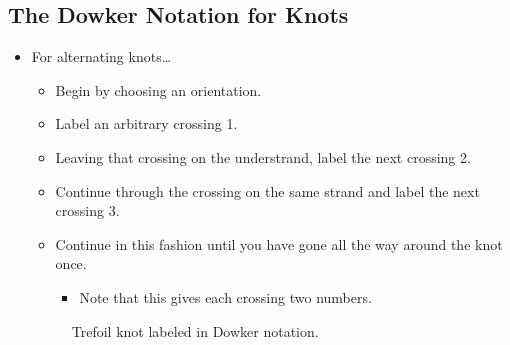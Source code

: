\documentclass[titlepage]{article}
\numberwithin{figure}{section}
\numberwithin{table}{section}
\numberwithin{equation}{section}
\begin{document}
\subsection{The Dowker Notation for Knots}\label{sss:Dowker}
\begin{itemize}
    \item For alternating knots\dots
    \begin{itemize}
        \item Begin by choosing an orientation.
        \item Label an arbitrary crossing 1.
        \item Leaving that crossing on the understrand, label the next crossing 2.
        \item Continue through the crossing on the same strand and label the next crossing 3.
        \item Continue in this fashion until you have gone all the way around the knot once.
        \begin{itemize}
            \item Note that this gives each crossing two numbers.
        \end{itemize}
    \end{itemize}
    \begin{figure}[h!]
        \centering
        \caption{Trefoil knot labeled in Dowker notation.}
        \label{fig:Dowkertrefoil}
    \end{figure}

\end{itemize}
\end{document}
